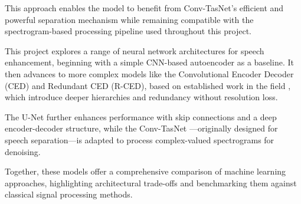 This approach enables the model to benefit from Conv-TasNet’s efficient and powerful separation mechanism while remaining compatible with the spectrogram-based processing pipeline used throughout this project.


\vspace{1em}
This project explores a range of neural network architectures for speech enhancement, beginning with a simple CNN-based autoencoder as a baseline. It then advances to more complex models like the Convolutional Encoder Decoder (CED) and Redundant CED (R-CED), based on established work in the field \cite{park2017acoustic}, which introduce deeper hierarchies and redundancy without resolution loss.

The U-Net further enhances performance with skip connections and a deep encoder-decoder structure, while the Conv-TasNet \cite{luo2019conv}—originally designed for speech separation—is adapted to process complex-valued spectrograms for denoising.

Together, these models offer a comprehensive comparison of machine learning approaches, highlighting architectural trade-offs and benchmarking them against classical signal processing methods.



